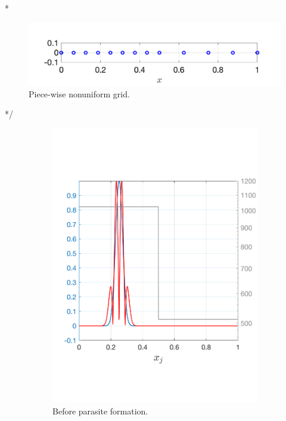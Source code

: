 \documentclass[final]{amsart}
\numberwithin{equation}{section}
\begin{document}
\/*
\begin{figure}[H]
	\centering
	\centering
	\includegraphics[scale=.5]{../figures/fig_grid_piecewise_nonu_2}	
	\caption{Piece-wise nonuniform grid.}
	\label{fig_grid_piecewise_nonu}
\end{figure}
*/
\begin{figure}[H]
	\begin{subfigure}[b]{.3\textwidth}
		\includegraphics[width=\textwidth]{../figures/fig_CNCS_20_para_1}	
		\caption{
			\label{fig:CNCS_parasite_1D_1}
			Before parasite formation.
		}
	\end{subfigure}
	\begin{subfigure}[b]{.3\textwidth}

\end{subfigure}
\end{figure}
\end{document}
